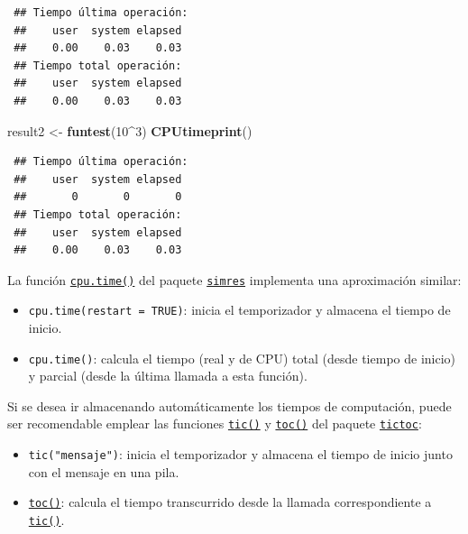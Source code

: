 \documentclass[
  spanish,
  10pt,
]{book}
\newenvironment{Shaded}{\begin{snugshade}}{\end{snugshade}}
\newcommand{\DecValTok}[1]{\textcolor[rgb]{0.00,0.00,0.81}{#1}}
\newcommand{\FunctionTok}[1]{\textcolor[rgb]{0.13,0.29,0.53}{\textbf{#1}}}
\newcommand{\NormalTok}[1]{#1}
\newcommand{\OtherTok}[1]{\textcolor[rgb]{0.56,0.35,0.01}{#1}}
\newcommand{\SpecialCharTok}[1]{\textcolor[rgb]{0.81,0.36,0.00}{\textbf{#1}}}
\theoremstyle{break}
\theoremstyle{nonumberplain}
\begin{document}
\begin{verbatim}
 ## Tiempo última operación:
 ##    user  system elapsed 
 ##    0.00    0.03    0.03 
 ## Tiempo total operación:
 ##    user  system elapsed 
 ##    0.00    0.03    0.03
\end{verbatim}

\begin{Shaded}
\begin{Highlighting}[]
\NormalTok{result2 }\OtherTok{\textless{}{-}} \FunctionTok{funtest}\NormalTok{(}\DecValTok{10}\SpecialCharTok{\^{}}\DecValTok{3}\NormalTok{)}
\FunctionTok{CPUtimeprint}\NormalTok{()}
\end{Highlighting}
\end{Shaded}

\begin{verbatim}
 ## Tiempo última operación:
 ##    user  system elapsed 
 ##       0       0       0 
 ## Tiempo total operación:
 ##    user  system elapsed 
 ##    0.00    0.03    0.03
\end{verbatim}

La función \href{https://rubenfcasal.github.io/simres/reference/cpu.time.html}{\texttt{cpu.time()}} del paquete \href{https://rubenfcasal.github.io/simres}{\texttt{simres}} implementa una aproximación similar:

\begin{itemize}
\item
  \texttt{cpu.time(restart\ =\ TRUE)}: inicia el temporizador y almacena el tiempo de inicio.
\item
  \texttt{cpu.time()}: calcula el tiempo (real y de CPU) total (desde tiempo de inicio) y parcial (desde la última llamada a esta función).
\end{itemize}

Si se desea ir almacenando automáticamente los tiempos de computación, puede ser recomendable emplear las funciones \href{https://rdrr.io/pkg/tictoc/man/tic.html}{\texttt{tic()}} y \href{https://rdrr.io/pkg/tictoc/man/tic.html}{\texttt{toc()}} del paquete \href{https://github.com/jabiru/tictoc}{\texttt{tictoc}}:

\begin{itemize}
\item
  \texttt{tic("mensaje")}: inicia el temporizador y almacena el tiempo de inicio junto con el mensaje en una pila.
\item
  \href{https://rdrr.io/pkg/tictoc/man/tic.html}{\texttt{toc()}}: calcula el tiempo transcurrido desde la llamada correspondiente a \href{https://rdrr.io/pkg/tictoc/man/tic.html}{\texttt{tic()}}.
\end{itemize}
\end{document}

